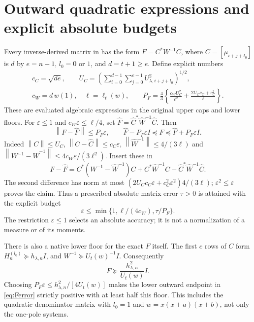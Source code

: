 \documentclass[11pt]{article}
\newcommand{\norm}[1]{\left\lVert#1\right\rVert}
\begin{document}
\section{Outward quadratic expressions and explicit absolute budgets}

Every inverse-derived matrix in \cite{FM} has the form
$F=C^*W^{-1}C$, where $C=[\mu_{i+j+l_0}]$ is $d$ by $e=n+1$,
$l_0=0$ or $1$, and $d=t+1\ge e$. Define explicit numbers
\begin{equation}\label{eq:P}
 \begin{gathered}
 c_C=\sqrt{de},\qquad
 U_C=\left(\sum_{i=0}^{d-1}\sum_{j=0}^{e-1}
                     U_{\lambda,i+j+l_0}^{2}\right)^{1/2},\\
 c_W=d\,w(1),\quad \ell=\ell_t(w),\qquad
 P_F=\frac43\left\{\frac{c_WU_C^2}{\ell^2}
                  +\frac{2U_Cc_C+c_C^2}{\ell}\right\}.
 \end{gathered}
\end{equation}
These are evaluated algebraic expressions in the original upper
caps and lower floors. For $\varepsilon\le1$ and
$c_W\varepsilon\le\ell/4$, set
$\widehat F=\widehat C^*\widehat W^{-1}\widehat C$.
Then
\begin{equation}\label{eq:Ferror}
 \norm{F-\widehat F}\le P_F\varepsilon,
 \qquad \widehat F-P_F\varepsilon I\preceq F
 \preceq\widehat F+P_F\varepsilon I.
\end{equation}
Indeed $\norm{C}\le U_C$, $\norm{C-\widehat C}\le c_C\varepsilon$,
$\norm{\widehat W^{-1}}\le4/(3\ell)$ and
$\norm{W^{-1}-\widehat W^{-1}}\le4c_W\varepsilon/(3\ell^2)$.
Insert these in
\[
 F-\widehat F=C^*(W^{-1}-\widehat W^{-1})C
              +C^*\widehat W^{-1}C-
                    \widehat C^*\widehat W^{-1}\widehat C.
\]
The second difference has norm at most
$(2U_Cc_C\varepsilon+c_C^2\varepsilon^2)4/(3\ell)$;
$\varepsilon^2\le\varepsilon$ proves the claim. Thus a prescribed
absolute matrix error $\tau>0$ is attained with the explicit budget
\begin{equation}\label{eq:budgetF}
 \varepsilon\le\min\{1,\ell/(4c_W),\tau/P_F\}.
\end{equation}
The restriction $\varepsilon\le1$ selects an absolute accuracy;
it is not a normalization of a measure or of its moments.

There is also a native lower floor for the exact $F$ itself. The
first $e$ rows of $C$ form $H_n^{(l_0)}\succeq h_{\lambda,n}I$,
and $W^{-1}\succeq U_t(w)^{-1}I$. Consequently
\begin{equation}\label{eq:Ffloor}
 F\succeq\frac{h_{\lambda,n}^2}{U_t(w)}I.
\end{equation}
Choosing $P_F\varepsilon\le h_{\lambda,n}^2/[4U_t(w)]$
makes the lower outward endpoint in \eqref{eq:Ferror} strictly
positive with at least half this floor. This includes the
quadratic-denominator matrix with $l_0=1$ and
$w=x(x+a)(x+b)$, not only the one-pole systems.
\end{document}
